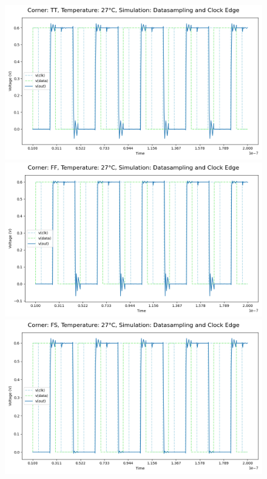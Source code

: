 \begin{figure}[H]
    \centering
    \includegraphics[height= 0.21\textheight]{figures/aimspice/TT27W1.png}
    \vspace{5pt}
    \includegraphics[height= 0.21\textheight]{figures/aimspice/FF27W1.png}
    \vspace{5pt}
    \includegraphics[height= 0.21\textheight]{figures/aimspice/FS27W1.png}

\end{figure}
